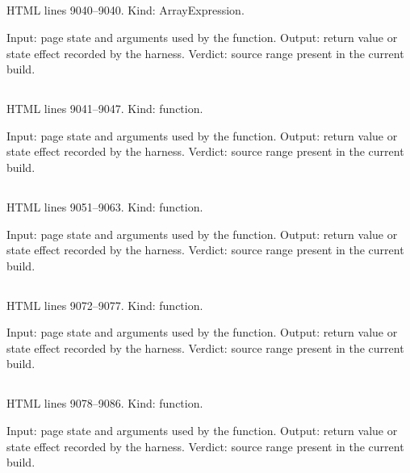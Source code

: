 \subsection*{\texttt{}}
\label{vf_494_BLANK_ROLES}
HTML lines 9040--9040. Kind: ArrayExpression.

Input: page state and arguments used by the function.
Output: return value or state effect recorded by the harness.
Verdict: source range present in the current build.

\subsection*{\texttt{}}
\label{vf_495_orphanBlankRole}
HTML lines 9041--9047. Kind: function.

Input: page state and arguments used by the function.
Output: return value or state effect recorded by the harness.
Verdict: source range present in the current build.

\subsection*{\texttt{}}
\label{vf_496_orphanOtherChannels}
HTML lines 9051--9063. Kind: function.

Input: page state and arguments used by the function.
Output: return value or state effect recorded by the harness.
Verdict: source range present in the current build.

\subsection*{\texttt{}}
\label{vf_497_resultCq}
HTML lines 9072--9077. Kind: function.

Input: page state and arguments used by the function.
Output: return value or state effect recorded by the harness.
Verdict: source range present in the current build.

\subsection*{\texttt{}}
\label{vf_498_resultAnswers}
HTML lines 9078--9086. Kind: function.

Input: page state and arguments used by the function.
Output: return value or state effect recorded by the harness.
Verdict: source range present in the current build.

